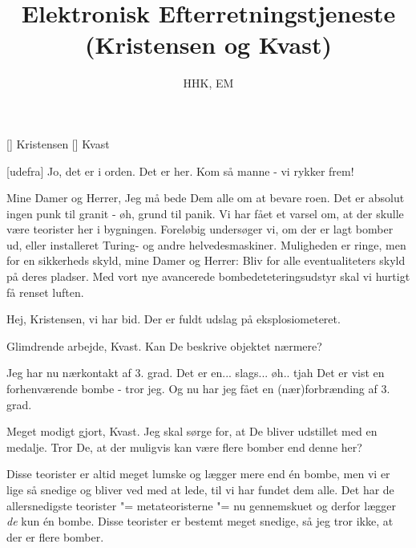 \documentclass[a4paper,11pt]{article}
\title{Elektronisk Efterretningstjeneste (Kristensen og Kvast)}
\author{HHK, EM}
\begin{document}
\maketitle

\begin{roles}
[] Kristensen
[] Kvast
\end{roles}

\begin{sketch}


  [udefra] Jo, det er i orden.  Det er her.  Kom så
  manne - vi rykker frem!


   Mine Damer og Herrer, Jeg må bede Dem alle om at bevare
  roen.  Det er absolut ingen punk til granit - øh, grund til panik.
  Vi har fået et varsel om, at der skulle være teorister her i
  bygningen.  Foreløbig undersøger vi, om der er lagt bomber ud, eller
  installeret Turing- og andre helvedesmaskiner.  Muligheden er ringe,
  men for en sikkerheds skyld, mine Damer og Herrer: Bliv for alle
  eventualiteters skyld på deres pladser.  Med vort nye avancerede
  bombedeteteringsudstyr skal vi hurtigt få renset luften.


   Hej, Kristensen, vi har bid.  Der er fuldt udslag på
  eksplosiometeret.

   Glimdrende arbejde, Kvast.  Kan De beskrive objektet
  nærmere?

   Jeg har nu nærkontakt af 3. grad.  Det er
  en... slags... øh.. tjah  Det er
  vist en forhenværende bombe - tror jeg.   Og nu har jeg
  fået en (nær)forbrænding af 3. grad.

   Meget modigt gjort, Kvast.  Jeg skal sørge for, at De
  bliver udstillet med en medalje.  Tror De, at der muligvis kan være
  flere bomber end denne her?

   Disse teorister er altid meget lumske og lægger mere end én
  bombe, men vi er lige så snedige og bliver ved med at lede, til vi
  har fundet dem alle.  Det har de allersnedigste teorister "=
  metateoristerne "= nu gennemskuet og derfor lægger {\em de} kun én
  bombe.  Disse teorister er bestemt meget snedige, så jeg tror ikke,
  at der er flere bomber.


\end{sketch}
\end{document}
